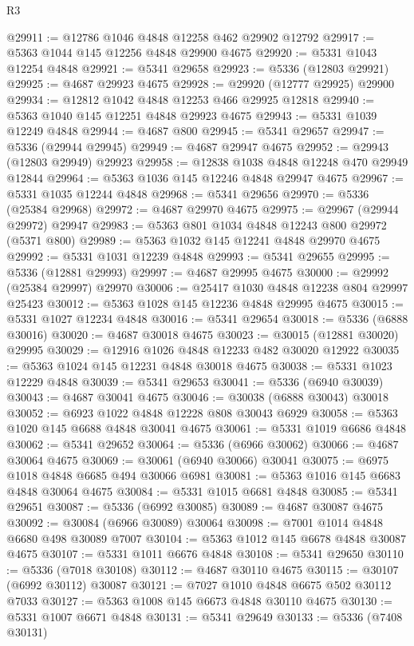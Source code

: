 \begin{lexlean}{R3}
\begin{coremodule}
@29911 := @12786 @1046 @4848 @12258 @462 @29902 @12792
@29917 := @5363 @1044 @145 @12256 @4848 @29900 @4675
@29920 := @5331 @1043 @12254 @4848
@29921 := @5341 @29658
@29923 := @5336 (@12803 @29921)
@29925 := @4687 @29923 @4675
@29928 := @29920 (@12777 @29925) @29900
@29934 := @12812 @1042 @4848 @12253 @466 @29925 @12818
@29940 := @5363 @1040 @145 @12251 @4848 @29923 @4675
@29943 := @5331 @1039 @12249 @4848
@29944 := @4687 @800
@29945 := @5341 @29657
@29947 := @5336 (@29944 @29945)
@29949 := @4687 @29947 @4675
@29952 := @29943 (@12803 @29949) @29923
@29958 := @12838 @1038 @4848 @12248 @470 @29949 @12844
@29964 := @5363 @1036 @145 @12246 @4848 @29947 @4675
@29967 := @5331 @1035 @12244 @4848
@29968 := @5341 @29656
@29970 := @5336 (@25384 @29968)
@29972 := @4687 @29970 @4675
@29975 := @29967 (@29944 @29972) @29947
@29983 := @5363 @801 @1034 @4848 @12243 @800 @29972 (@5371 @800)
@29989 := @5363 @1032 @145 @12241 @4848 @29970 @4675
@29992 := @5331 @1031 @12239 @4848
@29993 := @5341 @29655
@29995 := @5336 (@12881 @29993)
@29997 := @4687 @29995 @4675
@30000 := @29992 (@25384 @29997) @29970
@30006 := @25417 @1030 @4848 @12238 @804 @29997 @25423
@30012 := @5363 @1028 @145 @12236 @4848 @29995 @4675
@30015 := @5331 @1027 @12234 @4848
@30016 := @5341 @29654
@30018 := @5336 (@6888 @30016)
@30020 := @4687 @30018 @4675
@30023 := @30015 (@12881 @30020) @29995
@30029 := @12916 @1026 @4848 @12233 @482 @30020 @12922
@30035 := @5363 @1024 @145 @12231 @4848 @30018 @4675
@30038 := @5331 @1023 @12229 @4848
@30039 := @5341 @29653
@30041 := @5336 (@6940 @30039)
@30043 := @4687 @30041 @4675
@30046 := @30038 (@6888 @30043) @30018
@30052 := @6923 @1022 @4848 @12228 @808 @30043 @6929
@30058 := @5363 @1020 @145 @6688 @4848 @30041 @4675
@30061 := @5331 @1019 @6686 @4848
@30062 := @5341 @29652
@30064 := @5336 (@6966 @30062)
@30066 := @4687 @30064 @4675
@30069 := @30061 (@6940 @30066) @30041
@30075 := @6975 @1018 @4848 @6685 @494 @30066 @6981
@30081 := @5363 @1016 @145 @6683 @4848 @30064 @4675
@30084 := @5331 @1015 @6681 @4848
@30085 := @5341 @29651
@30087 := @5336 (@6992 @30085)
@30089 := @4687 @30087 @4675
@30092 := @30084 (@6966 @30089) @30064
@30098 := @7001 @1014 @4848 @6680 @498 @30089 @7007
@30104 := @5363 @1012 @145 @6678 @4848 @30087 @4675
@30107 := @5331 @1011 @6676 @4848
@30108 := @5341 @29650
@30110 := @5336 (@7018 @30108)
@30112 := @4687 @30110 @4675
@30115 := @30107 (@6992 @30112) @30087
@30121 := @7027 @1010 @4848 @6675 @502 @30112 @7033
@30127 := @5363 @1008 @145 @6673 @4848 @30110 @4675
@30130 := @5331 @1007 @6671 @4848
@30131 := @5341 @29649
@30133 := @5336 (@7408 @30131)

\end{coremodule}
\end{lexlean}
